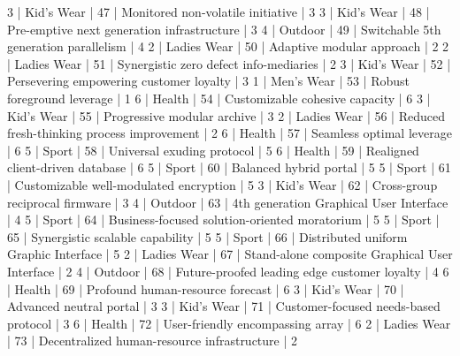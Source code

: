 \begin{enumerate}
\begin{pseudo*}
      3 | Kid's Wear  |      47 | Monitored non-volatile initiative                |        3   
      3 | Kid's Wear  |      48 | Pre-emptive next generation infrastructure       |        3   
      4 | Outdoor     |      49 | Switchable 5th generation parallelism            |        4   
      2 | Ladies Wear |      50 | Adaptive modular approach                        |        2   
      2 | Ladies Wear |      51 | Synergistic zero defect info-mediaries           |        2   
      3 | Kid's Wear  |      52 | Persevering empowering customer loyalty          |        3   
      1 | Men's Wear  |      53 | Robust foreground leverage                       |        1   
      6 | Health      |      54 | Customizable cohesive capacity                   |        6   
      3 | Kid's Wear  |      55 | Progressive modular archive                      |        3   
      2 | Ladies Wear |      56 | Reduced fresh-thinking process improvement       |        2   
      6 | Health      |      57 | Seamless optimal leverage                        |        6   
      5 | Sport       |      58 | Universal exuding protocol                       |        5   
      6 | Health      |      59 | Realigned client-driven database                 |        6   
      5 | Sport       |      60 | Balanced hybrid portal                           |        5   
      5 | Sport       |      61 | Customizable well-modulated encryption           |        5   
      3 | Kid's Wear  |      62 | Cross-group reciprocal firmware                  |        3   
      4 | Outdoor     |      63 | 4th generation Graphical User Interface          |        4   
      5 | Sport       |      64 | Business-focused solution-oriented moratorium    |        5   
      5 | Sport       |      65 | Synergistic scalable capability                  |        5   
      5 | Sport       |      66 | Distributed uniform Graphic Interface            |        5   
      2 | Ladies Wear |      67 | Stand-alone composite Graphical User Interface   |        2   
      4 | Outdoor     |      68 | Future-proofed leading edge customer loyalty     |        4   
      6 | Health      |      69 | Profound human-resource forecast                 |        6   
      3 | Kid's Wear  |      70 | Advanced neutral portal                          |        3   
      3 | Kid's Wear  |      71 | Customer-focused needs-based protocol            |        3   
      6 | Health      |      72 | User-friendly encompassing array                 |        6   
      2 | Ladies Wear |      73 | Decentralized human-resource infrastructure      |        2   

\end{pseudo*}
\end{enumerate}
